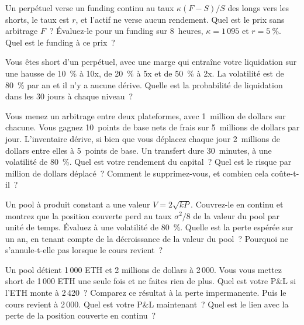 \begin{question}\label{iq:iv2:crypto-for-traders-and-researchers:20}
Un perpétuel verse un funding continu au taux $\kappa(F - S)/S$ des longs vers les shorts, le taux est $r$, et l'actif ne verse aucun rendement. Quel est le prix sans arbitrage $F$~? Évaluez-le pour un funding sur 8~heures, $\kappa = 1\,095$ et $r = 5~\%$. Quel est le funding à ce prix~?
\end{question}

\begin{question}\label{iq:iv2:crypto-for-traders-and-researchers:21}
Vous êtes short d'un perpétuel, avec une marge qui entraîne votre liquidation sur une hausse de 10~\% à 10x, de 20~\% à 5x et de 50~\% à 2x. La volatilité est de 80~\% par an et il n'y a aucune dérive. Quelle est la probabilité de liquidation dans les 30 jours à chaque niveau~?
\end{question}

\begin{question}\label{iq:iv2:crypto-for-traders-and-researchers:22}
Vous menez un arbitrage entre deux plateformes, avec 1~million de dollars sur chacune. Vous gagnez 10~points de base nets de frais sur 5~millions de dollars par jour. L'inventaire dérive, si bien que vous déplacez chaque jour 2~millions de dollars entre elles à 5~points de base. Un transfert dure 30~minutes, à une volatilité de 80~\%. Quel est votre rendement du capital~? Quel est le risque par million de dollars déplacé~? Comment le supprimez-vous, et combien cela coûte-t-il~?
\end{question}

\begin{question}\label{iq:iv2:crypto-for-traders-and-researchers:23}
Un pool à produit constant a une valeur $V = 2\sqrt{kP}$. Couvrez-le en continu et montrez que la position couverte perd au taux $\sigma^2/8$ de la valeur du pool par unité de temps. Évaluez à une volatilité de 80~\%. Quelle est la perte espérée sur un an, en tenant compte de la décroissance de la valeur du pool~? Pourquoi ne s'annule-t-elle pas lorsque le cours revient~?
\end{question}

\begin{question}\label{iq:iv2:crypto-for-traders-and-researchers:24}
Un pool détient 1\,000 ETH et 2 millions de dollars à 2\,000. Vous vous mettez short de 1\,000 ETH une seule fois et ne faites rien de plus. Quel est votre P\&L si l'ETH monte à 2\,420~? Comparez ce résultat à la perte impermanente. Puis le cours revient à 2\,000. Quel est votre P\&L maintenant~? Quel est le lien avec la perte de la position couverte en continu~?
\end{question}

